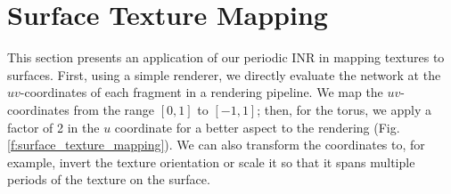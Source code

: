 






\section{Surface Texture Mapping}

This section presents an application of our periodic INR in mapping textures to surfaces. First, using a simple renderer, we directly evaluate the network at the $uv$-coordinates of each fragment in a rendering pipeline. We map the $uv$-coordinates from the range $[0, 1]$ to  $[-1, 1]$; then, for the torus, we apply a factor of 2 in the $u$ coordinate for a better aspect to the rendering (Fig.\ref{f:surface_texture_mapping}). 
We can also transform the coordinates to, for example, invert the texture orientation or scale it so that it spans multiple periods of the texture on the surface.

